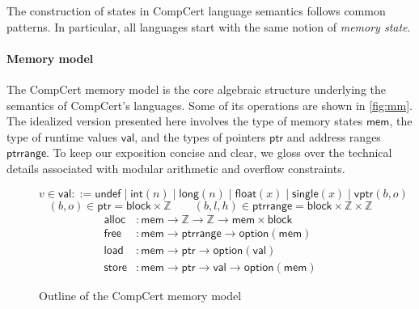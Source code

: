 \documentclass[sigplan,screen,review]{acmart}
\newcommand{\figsize}{\small}
\newcommand{\kw}[1]{\ensuremath{ \mathsf{#1} }}
\begin{document}
The construction of states in CompCert language semantics
follows common patterns.
In particular,
all languages start with
the same notion of \emph{memory state}.


\paragraph{Memory model} \label{sec:sem:mm} %

The CompCert memory model \cite{compcertmm,compcertmmv2}
is the core algebraic structure
underlying the semantics of CompCert's languages.
Some of its operations
are shown in \autoref{fig:mm}.
The idealized version presented here
involves
the type of memory states \kw{mem},
the type of runtime values \kw{val}, and
the types of pointers \kw{ptr} and address ranges \kw{ptrrange}.
To keep our exposition concise and clear,
we gloss over the technical details
associated with modular arithmetic and overflow constraints.

\begin{figure} %
  \figsize
  \[
    v \in \kw{val} ::=
          \kw{undef} \mid
          \kw{int}(n) \mid
          \kw{long}(n) \mid
          \kw{float}(x) \mid
          \kw{single}(x) \mid
          \kw{vptr}(b, o)
  \]
  \[
    (b, o) \in \kw{ptr} =
      \kw{block} \times \mathbb{Z}
    \qquad
    (b, l, h) \in \kw{ptrrange} =
      \kw{block} \times \mathbb{Z} \times \mathbb{Z}
  \]
  \normalsize
  \begin{align*}
    \kw{alloc} &:
      \kw{mem} \rightarrow \mathbb{Z} \rightarrow \mathbb{Z} \rightarrow
      \kw{mem} \times \kw{block}
    \\
    \kw{free} &:
      \kw{mem} \rightarrow
      \kw{ptrrange} \rightarrow
      \kw{option}(\kw{mem})
    \\
    \kw{load} &:
      \kw{mem} \rightarrow \kw{ptr} \rightarrow \kw{option}(\kw{val})
    \\
    \kw{store} &:
      \kw{mem} \rightarrow \kw{ptr} \rightarrow \kw{val} \rightarrow \kw{option}(\kw{mem})
  \end{align*}
  \caption{Outline of the CompCert memory model}
  \label{fig:mm}
\end{figure}
\end{document}
